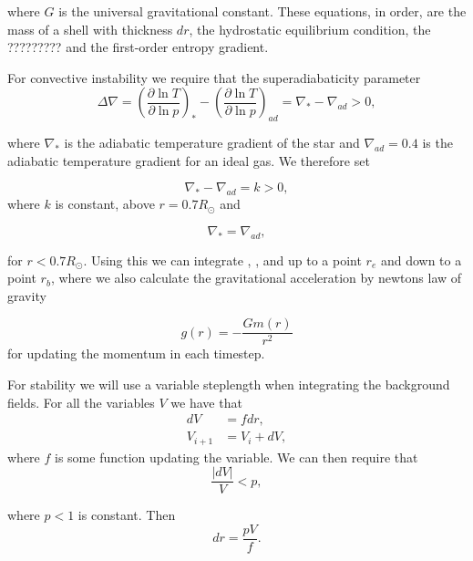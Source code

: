 \documentclass{article}
\begin{document}
where $G$ is the universal gravitational constant. These equations, in order, are the mass of a shell with thickness $dr$, the hydrostatic equilibrium condition, the ????????? and the first-order entropy gradient.

For convective instability we require that the superadiabaticity parameter 
\begin{equation*}
    \Delta\nabla = \left(\frac{\partial\ln T}{\partial\ln p} \right)_{*} - \left(\frac{\partial\ln T}{\partial\ln p} \right)_{ad} = \nabla_{*} -\nabla_{ad} > 0,
\end{equation*}

where $\nabla_{*}$ is the adiabatic temperature gradient of the star and $\nabla_{ad}=0.4$ is the adiabatic temperature gradient for an ideal gas. We therefore set 

\begin{equation*}
    \nabla_{*} -\nabla_{ad} = k > 0,
\end{equation*}
where $k$ is constant, above $r=0.7 R_{\odot}$ and

\begin{equation*}
    \nabla_{*} = \nabla_{ad},
\end{equation*}

for $r<0.7 R_{\odot}$. Using this we can integrate \label{eq:dm_dr}, \label{eq:dp_dr}, \label{eq:dT_dr} and \label{eq:ds_dr} up to a point $r_e$ and down to a point $r_b$, where we also calculate the gravitational acceleration by newtons law of gravity

\begin{equation}
    g(r) = - \frac{Gm(r)}{r^2}
\end{equation}
for updating the momentum in each timestep. 

For stability we will use a variable steplength when integrating the background fields. For all the variables $V$ we have that
\begin{align*}
    dV &= fdr,\\
    V_{i+1} &= V_i + dV,
\end{align*}
where $f$ is some function updating the variable. We can then require that
\begin{equation*}
    \frac{|dV|}{V} < p,
\end{equation*}

where $p<1$ is constant. Then
\begin{equation*}
    dr = \frac{pV}{f}.
\end{equation*}
\end{document}

